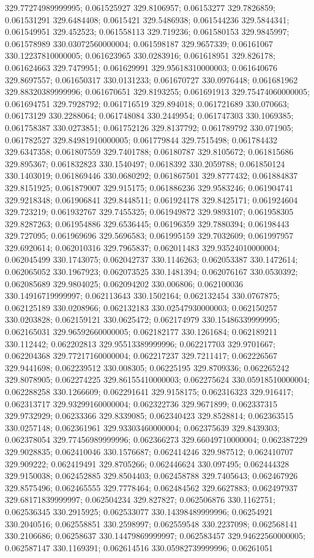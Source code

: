 329.77274989999995; 0.061525927 329.8106957; 0.06153277 329.7826859; 0.061531291 329.6484408; 0.0615421 329.5486938; 0.061544236 329.5844341; 0.061549951 329.452523; 0.061558113 329.719236; 0.061580153 329.9845997; 0.061578989 330.03072560000004; 0.061598187 329.9657339; 0.06161067 330.12237810000005; 0.061623965 330.0283916; 0.061618951 329.826178; 0.061624663 329.7479951; 0.061629991 329.95618310000003; 0.061640676 329.8697557; 0.061650317 330.0131233; 0.061670727 330.0976448; 0.061681962 329.88320389999996; 0.061670651 329.8193255; 0.061691913 329.75474060000005; 0.061694751 329.7928792; 0.061716519 329.894018; 0.061721689 330.070663; 0.06173129 330.2288064; 0.061748084 330.2449954; 0.061747303 330.1069385; 0.061758387 330.0273851; 0.061752126 329.8137792; 0.061789792 330.071905; 0.061782527 329.84981910000005; 0.061779844 329.7515498; 0.061784432 329.6347358; 0.061807559 329.7401788; 0.06180787 329.8105672; 0.061815686 329.895367; 0.061832823 330.1540497; 0.0618392 330.2059788; 0.061850124 330.1403019; 0.061869446 330.0680292; 0.061867501 329.8777432; 0.061884837 329.8151925; 0.061879007 329.915175; 0.061886236 329.9583246; 0.061904741 329.9218348; 0.061906841 329.8448511; 0.061924178 329.8425171; 0.061924604 329.723219; 0.061932767 329.7455325; 0.061949872 329.9893107; 0.061958305 329.8287263; 0.061954886 329.6536445; 0.06196359 329.7880394; 0.06198443 329.727095; 0.061969696 329.5696583; 0.061995159 329.7032609; 0.061997957 329.6920614; 0.062010316 329.7965837; 0.062011483 329.93524010000004; 0.062045499 330.1743075; 0.062042737 330.1146263; 0.062053387 330.1472614; 0.062065052 330.1967923; 0.062073525 330.1481394; 0.062076167 330.0530392; 0.062085689 329.9804025; 0.062094202 330.006806; 0.062100036 330.14916719999997; 0.062113643 330.1502164; 0.062132454 330.0767875; 0.062125189 330.0208966; 0.062132183 330.02547930000003; 0.062150257 330.0203828; 0.062159121 330.0625472; 0.062174979 330.15486339999995; 0.062165031 329.96592660000005; 0.062182177 330.1261684; 0.062189211 330.112442; 0.062202813 329.95513389999996; 0.062217703 329.9701667; 0.062204368 329.77217160000004; 0.062217237 329.7211417; 0.062226567 329.9441698; 0.062239512 330.008305; 0.06225195 329.8709336; 0.062265242 329.8078905; 0.062274225 329.86155410000003; 0.062275624 330.05918510000004; 0.062288258 330.1266609; 0.062291641 329.9158175; 0.062316323 329.916417; 0.062313717 329.93299160000004; 0.062322736 329.9671899; 0.062337315 329.9732929; 0.06233366 329.8339085; 0.062340423 329.8528814; 0.062363515 330.0257148; 0.062361961 329.93303460000004; 0.062375639 329.8439303; 0.062378054 329.77456989999996; 0.062366273 329.66049710000004; 0.062387229 329.9028835; 0.062410046 330.1576687; 0.062414246 329.987512; 0.062410707 329.909222; 0.062419491 329.8705266; 0.062446624 330.097495; 0.062444328 329.9150038; 0.062452885 329.8504403; 0.062458788 329.7405643; 0.062467926 329.8575496; 0.062465555 329.7778464; 0.062484562 329.6627883; 0.062497937 329.68171839999997; 0.062504234 329.827827; 0.062506876 330.1162751; 0.062536345 330.2915925; 0.062533077 330.14398489999996; 0.06254921 330.2040516; 0.062558851 330.2598997; 0.062559548 330.2237098; 0.062568141 330.2106686; 0.06258637 330.14479869999997; 0.062583457 329.94622560000005; 0.062587147 330.1169391; 0.062614516 330.05982739999996; 0.06261051 